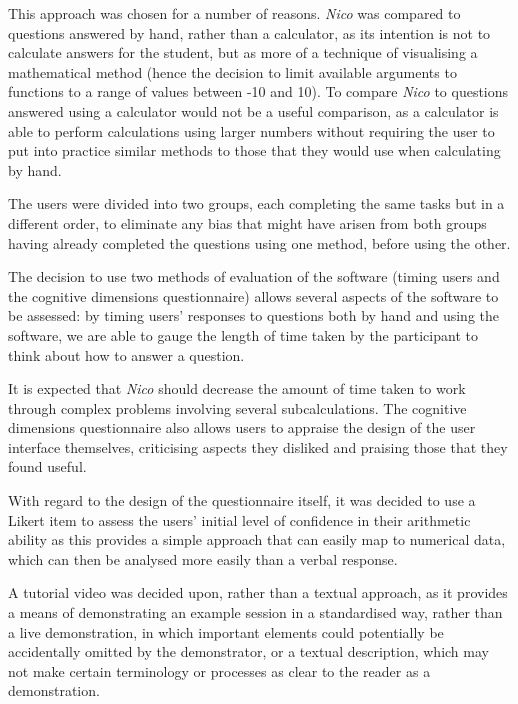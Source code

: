 \documentclass[12pt,twoside,notitlepage,xetex]{report}
\begin{document}
This approach was chosen for a number of reasons.  \emph{Nico} was compared to questions answered by hand, rather than a calculator, as its intention is not to calculate answers for the student, but as more of a technique of visualising a mathematical method (hence the decision to limit available arguments to functions to a range of values between -10 and 10).  To compare \emph{Nico} to questions answered using a calculator would not be a useful comparison, as a calculator is able to perform calculations using larger numbers without requiring the user to put into practice similar methods to those that they would use when calculating by hand.

The users were divided into two groups, each completing the same tasks but in a different order, to eliminate any bias that might have arisen from both groups having already completed the questions using one method, before using the other.

The decision to use two methods of evaluation of the software (timing users and the cognitive dimensions questionnaire) allows several aspects of the software to be assessed: by timing users' responses to questions both by hand and using the software, we are able to gauge the length of time taken by the participant to think about how to answer a question.

It is expected that \emph{Nico} should decrease the amount of time taken to work through complex problems involving several subcalculations.  The cognitive dimensions questionnaire also allows users to appraise the design of the user interface themselves, criticising aspects they disliked and praising those that they found useful.

With regard to the design of the questionnaire itself, it was decided to use a Likert item to assess the users' initial level of confidence in their arithmetic ability as this provides a simple approach that can easily map to numerical data, which can then be analysed more easily than a verbal response.

A tutorial video was decided upon, rather than a textual approach, as it provides a means of demonstrating an example session in a standardised way, rather than a live demonstration, in which important elements could potentially be accidentally omitted by the demonstrator, or a textual description, which may not make certain terminology or processes as clear to the reader as a demonstration.
\end{document}
